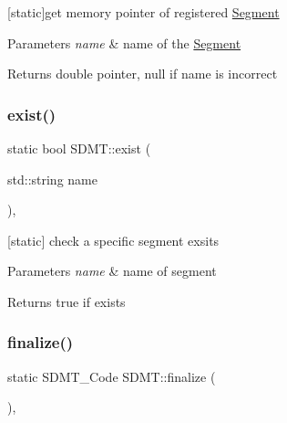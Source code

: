 \mbox{[}static\mbox{]}get memory pointer of registered \hyperlink{struct_s_d_m_t_1_1_segment}{Segment} 


\begin{DoxyParams}{Parameters}
{\em name} & name of the \hyperlink{struct_s_d_m_t_1_1_segment}{Segment} \\
\hline
\end{DoxyParams}
\begin{DoxyReturn}{Returns}
double pointer, null if name is incorrect 
\end{DoxyReturn}
\mbox{\label{class_s_d_m_t_a409904b122dea3efcacd91b2a3fd1ae0}} 
\subsubsection{\texorpdfstring{exist()}{exist()}}
{\footnotesize\ttfamily static bool S\+D\+M\+T\+::exist (\begin{DoxyParamCaption}\item[{std\+::string}]{name }\end{DoxyParamCaption})\hspace{0.3cm}{\ttfamily [inline]}, {\ttfamily [static]}}



\mbox{[}static\mbox{]} check a specific segment exsits 


\begin{DoxyParams}{Parameters}
{\em name} & name of segment \\
\hline
\end{DoxyParams}
\begin{DoxyReturn}{Returns}
true if exists 
\end{DoxyReturn}
\mbox{\label{class_s_d_m_t_af56c324524d2b8684f268b78d7e64534}} 
\subsubsection{\texorpdfstring{finalize()}{finalize()}}
{\footnotesize\ttfamily static S\+D\+M\+T\+\_\+\+Code S\+D\+M\+T\+::finalize (\begin{DoxyParamCaption}{ }\end{DoxyParamCaption})\hspace{0.3cm}{\ttfamily [inline]}, {\ttfamily [static]}}



